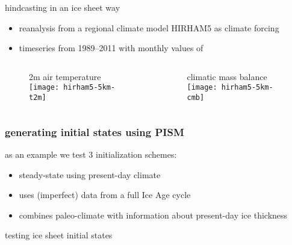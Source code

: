 \documentclass[hide notes,intlimits]{beamer}
\begin{document}
\begin{frame}{hindcasting in an ice sheet way}
  \begin{itemize}
  \item reanalysis from a regional climate model HIRHAM5 as climate forcing
  \item timeseries from 1989--2011 with monthly values of
  \end{itemize}
 \begin{columns}[c]
    \begin{column}{.5\linewidth}
      \vspace{-.5cm}
      \begin{figure}
        2m air temperature\\
        \texttt{[image: hirham5-5km-t2m]}
     \end{figure}
    \end{column}
    \begin{column}{.5\linewidth}
      \vspace{-.5cm}
      \begin{figure}
        climatic mass balance\\
        \texttt{[image: hirham5-5km-cmb]}
     \end{figure}
    \end{column}
  \end{columns}
\end{frame}


\begin{frame}
  \frametitle{generating initial states using PISM}
  \begin{block}{as an example we test 3 initialization schemes:}
    \begin{itemize}
    \item {\color{dark blue}{constant-climate}} steady-state using
present-day climate
    \item {\color{dark orange}{paleo-climate}} uses (imperfect) data from a full Ice Age cycle
    \item {\color{dark violet}{flux-corrected paleo-climate}} combines
paleo-climate with information about present-day ice thickness
    \end{itemize}
  \end{block}
\end{frame}


\begin{frame}{testing ice sheet initial states}
  \begin{figure}
    
  \end{figure}
\end{frame}
\end{document}
